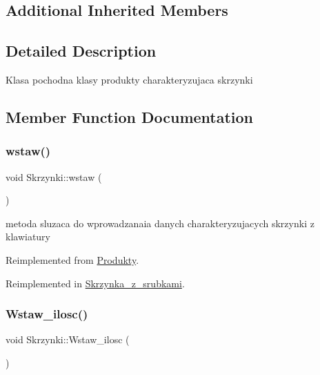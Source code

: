 \subsection*{Additional Inherited Members}


\subsection{Detailed Description}
Klasa pochodna klasy produkty charakteryzujaca skrzynki 

\subsection{Member Function Documentation}
\mbox{\label{class_skrzynki_a764d5064b25a294b3309dc5077a77921}} 
\subsubsection{\texorpdfstring{wstaw()}{wstaw()}}
{\footnotesize\ttfamily void Skrzynki\+::wstaw (\begin{DoxyParamCaption}{ }\end{DoxyParamCaption})\hspace{0.3cm}{\ttfamily [virtual]}}

metoda sluzaca do wprowadzanaia danych charakteryzujacych skrzynki z klawiatury 

Reimplemented from \mbox{\hyperlink{class_produkty_ad69fa64c8984c55fe9b1a2ade607a0ed}{Produkty}}.



Reimplemented in \mbox{\hyperlink{class_skrzynka__z__srubkami_a4726c1844080cb96e833cf16e977ecb3}{Skrzynka\+\_\+z\+\_\+srubkami}}.

\mbox{\label{class_skrzynki_a15e7e3b171152bd8e8a0fe5a72fcd249}} 
\subsubsection{\texorpdfstring{Wstaw\+\_\+ilosc()}{Wstaw\_ilosc()}}
{\footnotesize\ttfamily void Skrzynki\+::\+Wstaw\+\_\+ilosc (\begin{DoxyParamCaption}{ }\end{DoxyParamCaption})}

